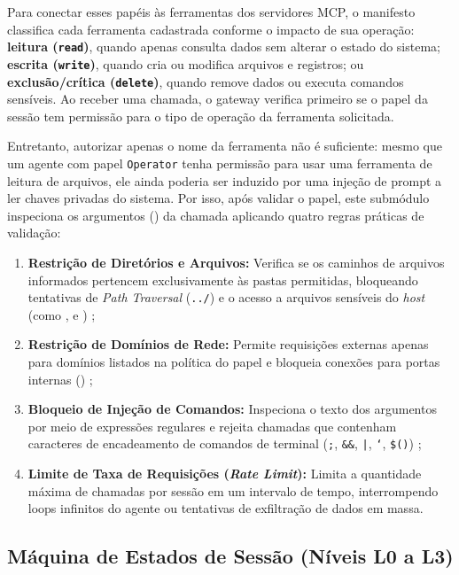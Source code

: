 Para conectar esses papéis às ferramentas dos servidores MCP, o manifesto classifica cada ferramenta cadastrada conforme o impacto de sua operação: \textbf{leitura (\texttt{read})}, quando apenas consulta dados sem alterar o estado do sistema; \textbf{escrita (\texttt{write})}, quando cria ou modifica arquivos e registros; ou \textbf{exclusão/crítica (\texttt{delete})}, quando remove dados ou executa comandos sensíveis. Ao receber uma chamada, o gateway verifica primeiro se o papel da sessão tem permissão para o tipo de operação da ferramenta solicitada.

Entretanto, autorizar apenas o nome da ferramenta não é suficiente: mesmo que um agente com papel \texttt{Operator} tenha permissão para usar uma ferramenta de leitura de arquivos, ele ainda poderia ser induzido por uma injeção de prompt a ler chaves privadas do sistema. Por isso, após validar o papel, este submódulo inspeciona os argumentos () da chamada  aplicando quatro regras práticas de validação:
\begin{enumerate}
  \item \textbf{Restrição de Diretórios e Arquivos:} Verifica se os caminhos de arquivos informados pertencem exclusivamente às pastas permitidas, bloqueando tentativas de \textit{Path Traversal} (\texttt{../}) e o acesso a arquivos sensíveis do \textit{host} (como ,  e ) \cite{hasan2026mcp,buhler2026agentbound};
  \item \textbf{Restrição de Domínios de Rede:} Permite requisições externas apenas para domínios listados na política do papel e bloqueia conexões para portas internas () \cite{jang2026hierarchical,hou2025mcp};
  \item \textbf{Bloqueio de Injeção de Comandos:} Inspeciona o texto dos argumentos por meio de expressões regulares e rejeita chamadas que contenham caracteres de encadeamento de comandos de terminal (\texttt{;}, \texttt{\&\&}, \texttt{|}, \texttt{`}, \texttt{\$()}) \cite{hasan2026mcp};
  \item \textbf{Limite de Taxa de Requisições (\textit{Rate Limit}):} Limita a quantidade máxima de chamadas por sessão em um intervalo de tempo, interrompendo loops infinitos do agente ou tentativas de exfiltração de dados em massa.
\end{enumerate}

\subsection{Máquina de Estados de Sessão (Níveis L0 a L3)}
\label{subsec:maquina_estados_l0_l3}

